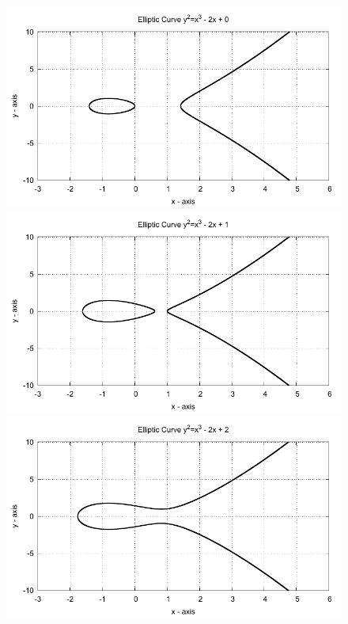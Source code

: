 \begin{figure}[!htbp]

  \begin{minipage}{0.3\textwidth} \centering
    \includegraphics{../Images/ecc_plot/22}
  \end{minipage}
  \begin{minipage}{0.3\textwidth} \centering
    \includegraphics{../Images/ecc_plot/23}
  \end{minipage}
  \begin{minipage}{0.3\textwidth} \centering
    \includegraphics{../Images/ecc_plot/24}
  \end{minipage}
\end{figure}

